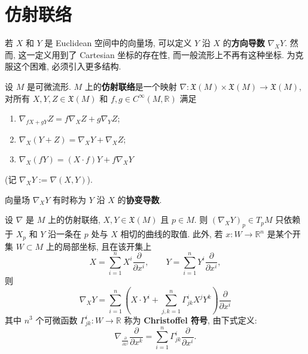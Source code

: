 \section{仿射联络}\label{sec:affine-connections}

若 $X$ 和 $Y$ 是 Euclidean 空间中的向量场, 可以定义 $Y$ 沿 $X$ 的\textbf{方向导数} $\nabla_XY$. 然而, 这一定义用到了 Cartesian 坐标的存在性, 而一般流形上不再有这种坐标. 为克服这个困难, 必须引入更多结构.

\begin{RiemannDefinition}\label{def:affine-connection}
设 $M$ 是可微流形. $M$ 上的\textbf{仿射联络}是一个映射 $\nabla:\mathfrak{X}(M)\times\mathfrak{X}(M)\to\mathfrak{X}(M)$, 对所有 $X,Y,Z\in\mathfrak{X}(M)$ 和 $f,g\in C^\infty(M,\mathbb{R})$ 满足
\begin{enumerate}[label=(\roman*),leftmargin=*]
\item $\nabla_{fX+gY}Z=f\nabla_XZ+g\nabla_YZ$;
\item $\nabla_X(Y+Z)=\nabla_XY+\nabla_XZ$;
\item $\nabla_X(fY)=(X\cdot f)Y+f\nabla_XY$
\end{enumerate}
(记 $\nabla_XY:=\nabla(X,Y)$).
\end{RiemannDefinition}

向量场 $\nabla_XY$ 有时称为 $Y$ 沿 $X$ 的\textbf{协变导数}.

\begin{RiemannProposition}\label{prop:local-expression-of-affine-connection}
设 $\nabla$ 是 $M$ 上的仿射联络, $X,Y\in\mathfrak{X}(M)$ 且 $p\in M$. 则 $(\nabla_XY)_p\in T_pM$ 只依赖于 $X_p$ 和 $Y$ 沿一条在 $p$ 处与 $X$ 相切的曲线的取值. 此外, 若 $x:W\to\mathbb{R}^n$ 是某个开集 $W\subset M$ 上的局部坐标, 且在该开集上
\[
  X=\sum_{i=1}^n X^i\frac{\partial}{\partial x^i},\qquad
  Y=\sum_{i=1}^n Y^i\frac{\partial}{\partial x^i},
\]
则
\begin{equation}\label{eq:local-expression-of-affine-connection}
  \nabla_XY=\sum_{i=1}^n
  \left(X\cdot Y^i+\sum_{j,k=1}^n\Gamma_{jk}^i X^jY^k\right)
  \frac{\partial}{\partial x^i}
\end{equation}
其中 $n^3$ 个可微函数 $\Gamma_{jk}^i:W\to\mathbb{R}$ 称为 \textbf{Christoffel 符号}, 由下式定义:
\begin{equation}\label{eq:definition-of-christoffel-symbols}
  \nabla_{\frac{\partial}{\partial x^j}}\frac{\partial}{\partial x^k}
  =\sum_{i=1}^n\Gamma_{jk}^i\frac{\partial}{\partial x^i}.
\end{equation}
\end{RiemannProposition}

